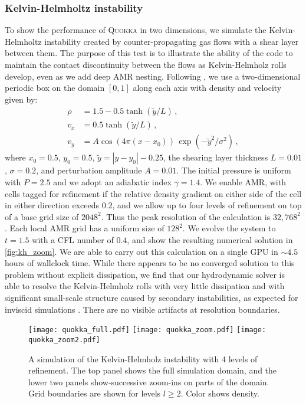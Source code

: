 \documentclass[fleqn,usenatbib]{mnras}
\begin{document}
\subsubsection{Kelvin-Helmholtz instability}
To show the performance of \textsc{Quokka} in two dimensions, we simulate the Kelvin-Helmholtz instability created by counter-propagating gas flows with a shear layer between them. The purpose of this test is to illustrate the ability of the code to maintain the contact discontinuity between the flows as Kelvin-Helmholz rolls develop, even as we add deep AMR nesting. Following \cite{Stone_2020}, we use a two-dimensional periodic box on the domain $[0, 1]$ along each axis with density and velocity given by:
\begin{align}
\rho &=  1.5 - 0.5 \tanh(\tilde y / L) \, , \\
v_x &= 0.5 \tanh(\tilde y / L) \, , \\
v_y &= A \cos(4\pi (x - x_0)) \, \exp(-{\tilde y}^2 / \sigma^2) \, ,
\end{align}
where $x_0 = 0.5$, $y_0 = 0.5$, $\tilde y = |y - y_0| - 0.25$, the shearing layer thickness $L = 0.01$, $\sigma = 0.2$, and perturbation amplitude $A = 0.01$. The initial pressure is uniform with $P = 2.5$ and we adopt an adiabatic index $\gamma = 1.4$. We enable AMR, with cells tagged for refinement if the relative density gradient on either side of the cell in either direction exceeds $0.2$, and we allow up to four levels of refinement on top of a base grid size of $2048^2$. Thus the peak resolution of the calculation is $32,768^2$. Each local AMR grid has a uniform size of $128^2$. We evolve the system to $t = 1.5$ with a CFL number of $0.4$, and show the resulting numerical solution in \autoref{fig:kh_zoom}. We are able to carry out this calculation on a single GPU in $\sim 4.5$ hours of wallclock time. While there appears to be no converged solution to this problem without explicit dissipation, we find that our hydrodynamic solver is able to resolve the Kelvin-Helmholz rolls with very little dissipation and with significant small-scale structure caused by secondary instabilities, as expected for inviscid simulations \citep{Lecoanet_2016}. There are no visible artifacts at resolution boundaries.

\begin{figure}
    \begin{center}
    \texttt{[image: quokka\_full.pdf]}
    \texttt{[image: quokka\_zoom.pdf]}
    \texttt{[image: quokka\_zoom2.pdf]}
    \end{center}
    \caption{A simulation of the Kelvin-Helmholz instability with 4 levels of refinement. The top panel shows the full simulation domain, and the lower two panels show-successive zoom-ins on parts of the domain. Grid boundaries are shown for levels $l \geq 2$. Color shows density.}
    \label{fig:kh_zoom}
\end{figure}
\end{document}

